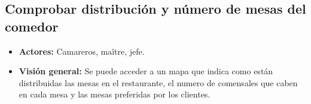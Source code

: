 \documentclass[spanish,a4paper,11pt, twoside]{report}	%
\begin{document}

			
		\subsection{Comprobar distribución y número de mesas del comedor}
			\begin{itemize}
				\item \textbf{Actores:} Camareros, maître, jefe.
				\item \textbf{Visión general:} Se puede acceder a un mapa que indica como están distribuidas las mesas en el restaurante, el numero de comensales que caben en cada mesa y las mesas preferidas por los clientes.
			\end {itemize}

\end{document}
